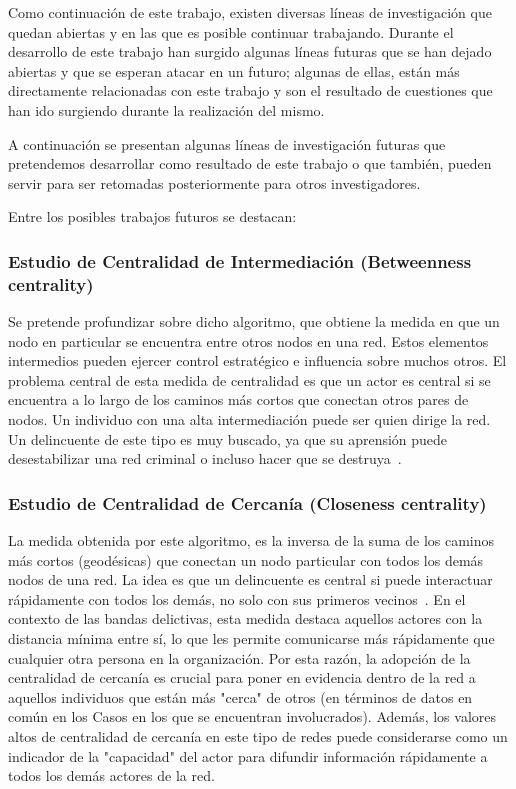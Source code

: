 
Como continuación de este trabajo, existen diversas líneas de investigación que quedan abiertas y en las que es posible continuar trabajando. Durante el desarrollo de este trabajo han surgido algunas líneas futuras que se han dejado abiertas y que se esperan atacar en un futuro; algunas de ellas, están más directamente relacionadas con este trabajo y son el resultado de cuestiones que han ido surgiendo durante la realización del mismo.

A continuación se presentan algunas líneas de investigación futuras que pretendemos desarrollar como resultado de este trabajo o que también, pueden servir para ser retomadas posteriormente para otros investigadores. 

Entre los posibles trabajos futuros se destacan:

\subsubsection{Estudio de Centralidad de Intermediación (Betweenness centrality)}
Se pretende profundizar sobre dicho algoritmo, que obtiene la medida en que un nodo en particular se encuentra entre otros nodos en una red. Estos elementos intermedios pueden ejercer control estratégico e influencia sobre muchos otros. El problema central de esta medida de centralidad es que un actor es central si se encuentra a lo largo de los caminos más cortos que conectan otros pares de nodos. Un individuo con una alta intermediación puede ser quien dirige la red. Un delincuente de este tipo es muy buscado, ya que su aprensión puede desestabilizar una red criminal o incluso hacer que se destruya~\cite{ref_article32}.

\subsubsection{Estudio de Centralidad de Cercanía (Closeness centrality)} 
La medida obtenida por este algoritmo, es la inversa de la suma de los caminos más cortos (geodésicas) que conectan un nodo particular con todos los demás nodos de una red. La idea es que un delincuente es central si puede interactuar rápidamente con todos los demás, no solo con sus primeros vecinos~\cite{ref_article33}. En el contexto de las bandas delictivas, esta medida destaca aquellos actores con la distancia mínima entre sí, lo que les permite comunicarse más rápidamente que cualquier otra persona en la organización. Por esta razón, la adopción de la centralidad de cercanía es crucial para poner en evidencia dentro de la red a aquellos individuos que están más "cerca" de otros (en términos de datos en común en los Casos en los que se encuentran involucrados). Además, los valores altos de centralidad de cercanía en este tipo de redes puede considerarse como un indicador de la "capacidad" del actor para difundir información rápidamente a todos los demás actores de la red.

